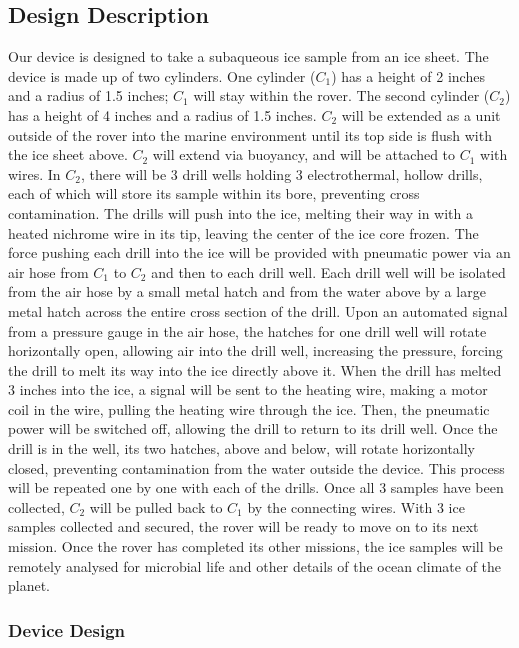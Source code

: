 \documentclass{article}
\begin{document}
\subsection{Design Description}
Our device is designed to take a subaqueous ice sample from an ice sheet. The device is made up of two cylinders. One cylinder ($C_1$) has a height of 2 inches and a radius of 1.5 inches; $C_1$ will stay within the rover. The second cylinder ($C_2$) has a height of 4 inches and a radius of 1.5 inches. $C_2$ will be extended as a unit outside of the rover into the marine environment until its top side is flush with the ice sheet above. $C_2$ will extend via buoyancy, and will be attached to $C_1$ with wires. In $C_2$, there will be 3 drill wells holding 3 electrothermal, hollow drills, each of which will store its sample within its bore, preventing cross contamination. The drills will push into the ice, melting their way in with a heated nichrome wire in its tip, leaving the center of the ice core frozen. The force pushing each drill into the ice will be provided with pneumatic power via an air hose from $C_1$ to $C_2$ and then to each drill well. Each drill well will be isolated from the air hose by a small metal hatch and from the water above by a large metal hatch across the entire cross section of the drill. Upon an automated signal from a pressure gauge in the air hose, the hatches for one drill well will rotate horizontally open, allowing air into the drill well, increasing the pressure, forcing the drill to melt its way into the ice directly above it. When the drill has melted 3 inches into the ice, a signal will be sent to the heating wire, making a motor coil in the wire, pulling the heating wire through the ice. Then, the pneumatic power will be switched off, allowing the drill to return to its drill well. Once the drill is in the well, its two hatches, above and below, will rotate horizontally closed, preventing contamination from the water outside the device. This process will be repeated one by one with each of the drills. Once all 3 samples have been collected, $C_2$ will be pulled back to $C_1$ by the connecting wires. With 3 ice samples collected and secured, the rover will be ready to move on to its next mission. Once the rover has completed its other missions, the ice samples will be remotely analysed for microbial life and other details of the ocean climate of the planet.

\subsubsection{Device Design}
\end{document}
